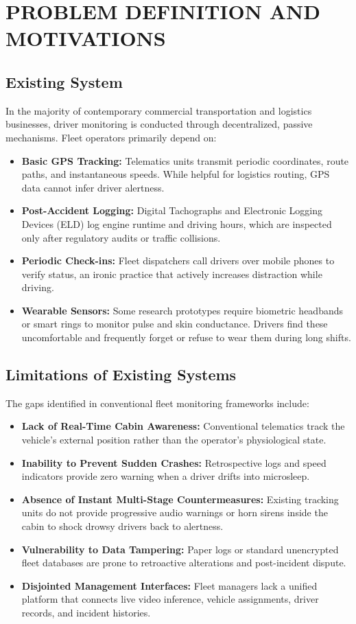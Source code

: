 \documentclass[a4paper,12pt]{report}
\begin{document}
\chapter{PROBLEM DEFINITION AND MOTIVATIONS}

\section{Existing System}
In the majority of contemporary commercial transportation and logistics businesses, driver monitoring is conducted through decentralized, passive mechanisms. Fleet operators primarily depend on:
\begin{itemize}
    \item \textbf{Basic GPS Tracking:} Telematics units transmit periodic coordinates, route paths, and instantaneous speeds. While helpful for logistics routing, GPS data cannot infer driver alertness.
    \item \textbf{Post-Accident Logging:} Digital Tachographs and Electronic Logging Devices (ELD) log engine runtime and driving hours, which are inspected only after regulatory audits or traffic collisions.
    \item \textbf{Periodic Check-ins:} Fleet dispatchers call drivers over mobile phones to verify status, an ironic practice that actively increases distraction while driving.
    \item \textbf{Wearable Sensors:} Some research prototypes require biometric headbands or smart rings to monitor pulse and skin conductance. Drivers find these uncomfortable and frequently forget or refuse to wear them during long shifts.
\end{itemize}

\section{Limitations of Existing Systems}
The gaps identified in conventional fleet monitoring frameworks include:
\begin{itemize}
    \item \textbf{Lack of Real-Time Cabin Awareness:} Conventional telematics track the vehicle's external position rather than the operator's physiological state.
    \item \textbf{Inability to Prevent Sudden Crashes:} Retrospective logs and speed indicators provide zero warning when a driver drifts into microsleep.
    \item \textbf{Absence of Instant Multi-Stage Countermeasures:} Existing tracking units do not provide progressive audio warnings or horn sirens inside the cabin to shock drowsy drivers back to alertness.
    \item \textbf{Vulnerability to Data Tampering:} Paper logs or standard unencrypted fleet databases are prone to retroactive alterations and post-incident dispute.
    \item \textbf{Disjointed Management Interfaces:} Fleet managers lack a unified platform that connects live video inference, vehicle assignments, driver records, and incident histories.
\end{itemize}
\end{document}
